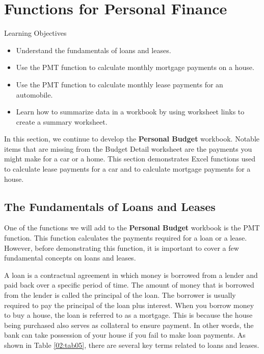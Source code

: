 \section{Functions for Personal Finance}\label{ch02:functions_personal}

\begin{center}
	\begin{objbox}{Learning Objectives}
		\begin{itemize}
			\setlength{\itemsep}{0pt}
			\setlength{\parskip}{0pt}
			\setlength{\parsep}{0pt}
			
			\item Understand the fundamentals of loans and leases.
			\item Use the PMT function to calculate monthly mortgage payments on a house.
			\item Use the PMT function to calculate monthly lease payments for an automobile.
			\item Learn how to summarize data in a workbook by using worksheet links to create a summary worksheet.

		\end{itemize}
	\end{objbox}
\end{center}

In this section, we continue to develop the \textbf{Personal Budget} workbook. Notable items that are missing from the Budget Detail worksheet are the payments you might make for a car or a home. This section demonstrates Excel functions used to calculate lease payments for a car and to calculate mortgage payments for a house.

\subsection{The Fundamentals of Loans and Leases}

One of the functions we will add to the \textbf{Personal Budget} workbook is the PMT function. This function calculates the payments required for a loan or a lease. However, before demonstrating this function, it is important to cover a few fundamental concepts on loans and leases.

A loan is a contractual agreement in which money is borrowed from a lender and paid back over a specific period of time. The amount of money that is borrowed from the lender is called the principal of the loan. The borrower is usually required to pay the principal of the loan plus interest. When you borrow money to buy a house, the loan is referred to as a mortgage. This is because the house being purchased also serves as collateral to ensure payment. In other words, the bank can take possession of your house if you fail to make loan payments. As shown in Table \ref{02:tab05}, there are several key terms related to loans and leases.

